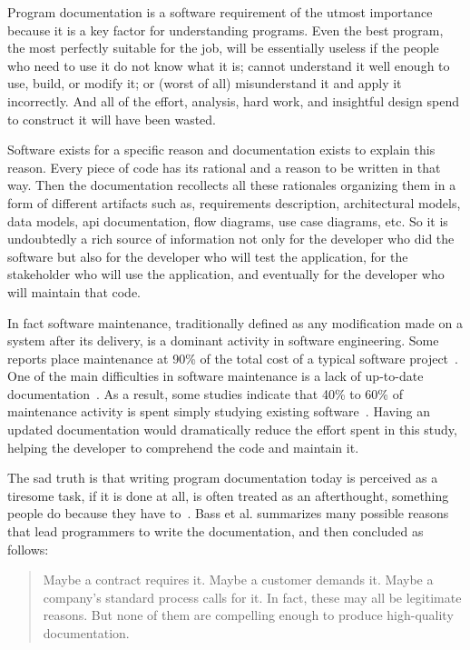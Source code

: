 Program documentation is a software requirement of the utmost importance because it is a key factor for understanding programs. Even the best program, the most perfectly suitable for the job, will be essentially useless if the people who need to use it do not know what it is; cannot understand it well enough to use, build, or modify it; or (worst of all) misunderstand it and apply it incorrectly. And all of the effort, analysis, hard work, and insightful design spend to construct it will have been wasted.

Software exists for a specific reason and documentation exists to explain this reason. Every piece of code has its rational and a reason to be written in that way. Then the documentation recollects all these rationales organizing them in a form of different artifacts such as, requirements description, architectural models, data models, \gls{api} documentation, flow diagrams, use case diagrams, etc. So it is undoubtedly a rich source of information not only for the developer who did the software but also for the developer who will test the application, for the stakeholder who will use the application, and eventually for the developer who will maintain that code.

In fact software maintenance, traditionally defined as any modification made on a system after its delivery, is a dominant activity in software engineering. Some reports place maintenance at 90\% of the total cost of a typical software project~\citep{seacord2003modernizing,pigoski1996practical}. One of the main difficulties in software maintenance is a lack of up-to-date documentation~\citep{de2005study}. As a result, some studies indicate that 40\% to 60\% of maintenance activity is spent simply studying existing software~\citep[p. 475 and p. 35 respectively]{pigoski1996practical,pfleeger1998software}. Having an updated documentation would dramatically reduce the effort spent in this study, helping the developer to comprehend the code and maintain it.

The sad truth is that writing program documentation today is perceived as a tiresome task, if it is done at all, is often treated as an afterthought, something people do because they have to~\citep{sousa1998survey}. Bass et al. summarizes many possible reasons that lead programmers to write the documentation, and then concluded as follows:

\blockquote{Maybe a contract requires it. Maybe a customer demands it. Maybe a company's standard process calls for it. In fact, these may all be legitimate reasons. But none of them are compelling enough to produce high-quality documentation.~\citep[p. 327]{BassClementsKazman201210}}

